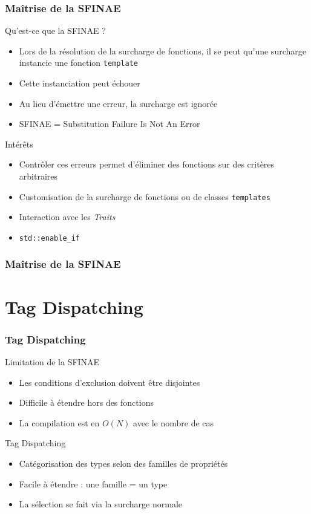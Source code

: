 \documentclass[svgnames]{beamer}
\begin{document}
\frame
{
  \frametitle{Maîtrise de la SFINAE}
  \begin{block}{Qu'est-ce que la SFINAE ?}
  \begin{itemize}
  \footnotesize
  \item Lors de la r\'esolution de la surcharge de fonctions, il se peut qu'une 
  surcharge instancie une fonction \texttt{template}
  \item Cette instanciation peut \'echouer
  \item Au lieu d'émettre une erreur, la surcharge est ignor\'ee
  \item SFINAE = Substitution Failure Is Not An Error
  \end{itemize}
  \end{block}

  \begin{overlayarea}{\textwidth}{5cm}
  {
    \begin{block}{Intérêts}
    \begin{itemize}
    \footnotesize
    \item Contrôler ces erreurs permet d'éliminer des fonctions sur des critères
    arbitraires
    \item Customisation de la surcharge de fonctions ou de classes \texttt{templates}
    \item Interaction avec les \textit{Traits}
    \item \texttt{std::enable\_if}
    \end{itemize}
    \end{block}
  }
  \end{overlayarea}
}

\frame
{
  \frametitle{Maîtrise de la SFINAE}
}

\section{Tag Dispatching}
\begin{frame}
\frametitle{Tag Dispatching}
\begin{block}{Limitation de la SFINAE}
\begin{itemize}
\item Les conditions d'exclusion doivent être disjointes
\item Difficile à étendre hors des fonctions
\item La compilation est en $O(N)$ avec le nombre de cas
\end{itemize}
\end{block}

\begin{block}{Tag Dispatching}
\begin{itemize}
\item Catégorisation des types selon des familles de propriétés
\item Facile à étendre : une famille = un type
\item La sélection se fait via la surcharge normale
\end{itemize}
\end{block}
\end{frame}
\end{document}

